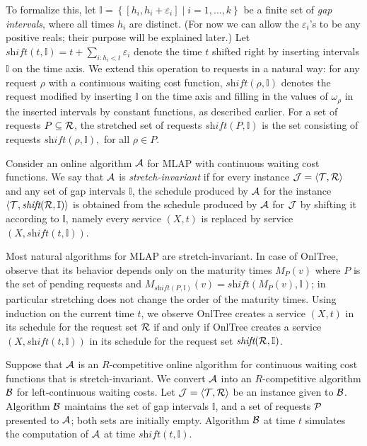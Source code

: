 \documentclass[a4paper]{article}
\newcommand{\calA}{{\cal A}}
\newcommand{\calB}{{\cal B}}
\newcommand{\calJ}{{\cal J}}
\newcommand{\calP}{{\cal P}}
\newcommand{\calR}{{\cal R}}
\newcommand{\calT}{{\cal T}}
\newcommand{\bbI}{\mathbb{I}}
\newcommand{\eps}{{\varepsilon}}
\newcommand{\braced}[1]{{ \left\{ #1 \right\} }}
\newcommand{\angled}[1]{{ \left\langle #1 \right\rangle }}
\newcommand{\OnAlgTreesGeneral}{{\sc OnlTree}}
\newcommand{\MLAP}{\mbox{\rm\textsf{MLAP}}}
\newcommand{\shift}{{\textit{shift}}}
\begin{document}
To formalize this, let $\bbI = \braced{[h_i,h_i+\eps_i] \mid i=1,\ldots, k}$
be a finite set of \emph{gap intervals}, where all times $h_i$ are distinct.
(For now we can allow the $\eps_i$'s to be any positive reals; their purpose will
be explained later.)
Let $\shift(t,\bbI)=t+\sum_{i:h_i<t}\eps_i$ denote the time $t$ shifted right by
inserting intervals $\bbI$ on the time axis. We extend this operation to
requests in a natural way: for any request $\rho$ with a 
continuous waiting cost function,
$\shift(\rho,\bbI)$ denotes the request modified by inserting $\bbI$
on the time axis and filling in the values of $\omega_\rho$ in the
inserted intervals by constant functions, as described earlier. For a set
of requests $P\subseteq \calR$,  the stretched set of requests
$\shift(P,\bbI)$ is the set consisting of requests $\shift(\rho,\bbI),$ for
all $\rho\in P$.

Consider an online algorithm $\calA$ for {\MLAP} with
continuous waiting cost functions.
We say that $\calA$ is {\em stretch-invariant} if for every instance $\calJ =
\angled{\calT,\calR}$ and any set of gap intervals $\bbI$, the
schedule produced by $\calA$ for the instance
$\angled{\calT,\shift(\calR,\bbI)}$ is obtained from the schedule
produced by $\calA$ for $\calJ$ by shifting it according to $\bbI$,
namely every service $(X,t)$ is
replaced by service $(X,\shift(t,\bbI))$.

Most natural algorithms for {\MLAP} are stretch-invariant. In case of
{\OnAlgTreesGeneral}, observe that its behavior depends only on the
maturity times $M_P(v)$ where $P$ is the set of pending requests and
$M_{\shift(P,\bbI)}(v)=\shift(M_P(v),\bbI)$; in particular
stretching does not change the order of the maturity times. 
Using induction on the current time $t$, we observe 
{\OnAlgTreesGeneral} creates a service $(X,t)$ in its schedule for the request set $\calR$
if and only if
{\OnAlgTreesGeneral} creates a service $(X,\shift(t,\bbI))$ in its schedule
for the request set $\shift(\calR,\bbI)$.

Suppose that $\calA$ is an $R$-competitive online
algorithm for continuous waiting cost functions that is stretch-invariant.  
We convert $\calA$ into an
$R$-competitive algorithm $\calB$ for left-continuous waiting costs.
Let $\calJ=\angled{\calT,\calR}$ be an instance given to $\calB$.
Algorithm $\calB$ maintains the set of gap intervals $\bbI$, and
a set of requests $\calP$ presented to $\calA$; both sets are
initially empty.  Algorithm $\calB$ at time $t$ simulates the
computation of $\calA$ at time $\shift(t,\bbI)$.
\end{document}
